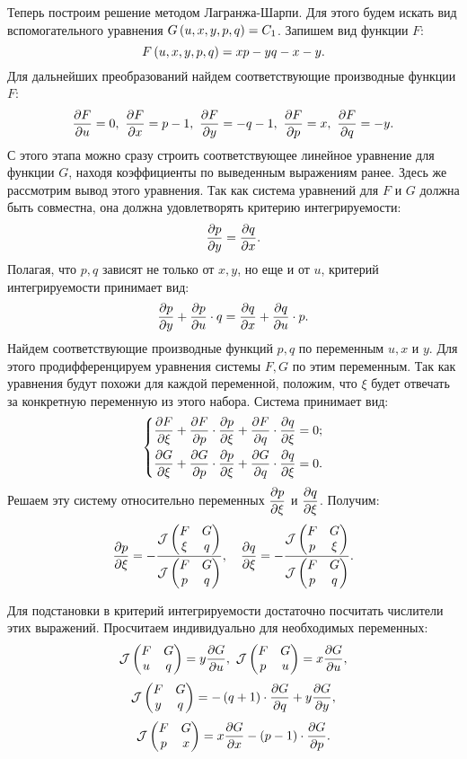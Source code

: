 		Теперь построим решение методом Лагранжа-Шарпи. Для этого будем искать вид вспомогательного уравнения $G \left( u, x, y, p, q \right) = C_1$. Запишем вид функции $F$:
		\[ F \left( u, x, y, p, q \right) = xp - yq - x - y. \]
		Для дальнейших преобразований найдем соответствующие производные функции $F$:
		\[ \dfrac{\partial F}{\partial u} = 0, ~ \dfrac{\partial F}{\partial x} = p - 1, ~ \dfrac{\partial F}{\partial y} = -q - 1, ~ \dfrac{\partial F}{\partial p} = x, ~ \dfrac{\partial F}{\partial q} = -y. \]
		С этого этапа можно сразу строить соответствующее линейное уравнение для функции $G$, находя коэффициенты по выведенным выражениям ранее. Здесь же рассмотрим вывод этого уравнения. Так как система уравнений для $F$ и $G$ должна быть совместна, она должна удовлетворять критерию интегрируемости:
		\[ \dfrac{\partial p}{\partial y} = \dfrac{\partial q}{\partial x}. \]
		Полагая, что $p, q$ зависят не только от $x, y$, но еще и от $u$, критерий интегрируемости принимает вид:
		\[ \dfrac{\partial p}{\partial y} + \dfrac{\partial p}{\partial u} \cdot q = \dfrac{\partial q}{\partial x} + \dfrac{\partial q}{\partial u} \cdot p. \]
		Найдем соответствующие производные функций $p, q$ по переменным $u, x$ и $y$. Для этого продифференцируем уравнения системы $F, G$ по этим переменным. Так как уравнения будут похожи для каждой переменной, положим, что $\xi$ будет отвечать за конкретную переменную из этого набора. Система принимает вид:
		\[ \left\lbrace \begin{split} 
			\dfrac{\partial F}{\partial \xi} + \dfrac{\partial F}{\partial p} \cdot \dfrac{\partial p}{\partial \xi} + \dfrac{\partial F}{\partial q} \cdot \dfrac{\partial q}{\partial \xi} &= 0; \\
			\dfrac{\partial G}{\partial \xi} + \dfrac{\partial G}{\partial p} \cdot \dfrac{\partial p}{\partial \xi} + \dfrac{\partial G}{\partial q} \cdot \dfrac{\partial q}{\partial \xi} &= 0. 
		\end{split} \right. \]
		Решаем эту систему относительно переменных $\dfrac{\partial p}{\partial \xi}$ и $\dfrac{\partial q}{\partial \xi}$. Получим:
		\[ 
			\dfrac{\partial p}{\partial \xi} = - \frac{\mathcal{J} \left( \begin{matrix} F & G \\ \xi & q \end{matrix} \right)}{\mathcal{J} \left( \begin{matrix} F & G \\ p & q \end{matrix} \right)}, \quad
			\dfrac{\partial q}{\partial \xi} = - \frac{\mathcal{J} \left( \begin{matrix} F & G \\ p & \xi \end{matrix} \right)}{\mathcal{J} \left( \begin{matrix} F & G \\ p & q \end{matrix} \right)}. 
		\]

		Для подстановки в критерий интегрируемости достаточно посчитать числители этих выражений. Просчитаем индивидуально для необходимых переменных:
		\[ \mathcal{J} \left( \begin{matrix} F & G \\ u & q \end{matrix} \right) = y \dfrac{\partial G}{\partial u}, ~ \mathcal{J} \left( \begin{matrix} F & G \\ p & u \end{matrix} \right) = x \dfrac{\partial G}{\partial u}, \]
		\[ \mathcal{J} \left( \begin{matrix} F & G \\ y & q \end{matrix} \right) = -\left( q + 1 \right) \cdot \dfrac{\partial G}{\partial q} + y \dfrac{\partial G}{\partial y}, \]
		\[ \mathcal{J} \left( \begin{matrix} F & G \\ p & x \end{matrix} \right) = x \dfrac{\partial G}{\partial x} - \left( p - 1 \right) \cdot \dfrac{\partial G}{\partial p}. \]

